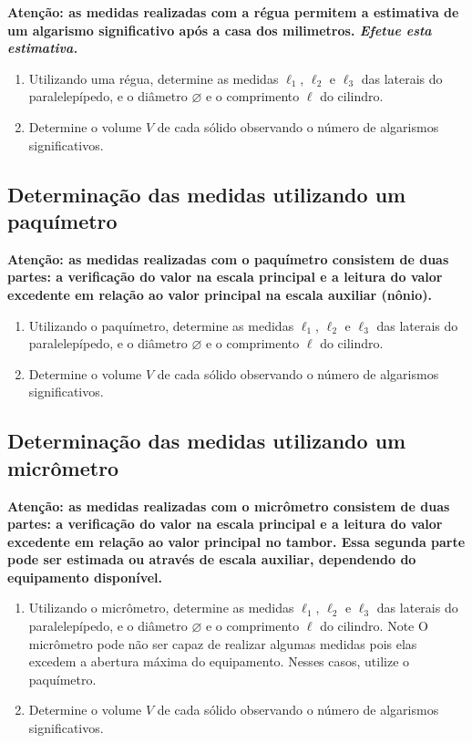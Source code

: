 \textbf{Atenção: as medidas realizadas com a régua permitem a estimativa de um algarismo significativo após a casa dos milimetros. \emph{Efetue esta estimativa.}}

\begin{enumerate}
\item Utilizando uma régua, determine as medidas $\ell_1$, $\ell_2$ e $\ell_3$ das laterais do paralelepípedo, e o diâmetro $\diameter$ e o comprimento $\ell$ do cilindro. 
\item Determine o volume $V$ de cada sólido observando o número de algarismos significativos.
\end{enumerate}

\subsection{Determinação das medidas utilizando um paquímetro}

\textbf{Atenção: as medidas realizadas com o paquímetro consistem de duas partes: a verificação do valor na escala principal e a leitura do valor excedente em relação ao valor principal na escala auxiliar (nônio).}

\begin{enumerate}
\item Utilizando o paquímetro, determine as medidas $\ell_1$, $\ell_2$ e $\ell_3$ das laterais do paralelepípedo, e o diâmetro $\diameter$ e o comprimento $\ell$ do cilindro.
\item Determine o volume $V$ de cada sólido observando o número de algarismos significativos.
\end{enumerate}

\subsection{Determinação das medidas utilizando um micrômetro}

\textbf{Atenção: as medidas realizadas com o micrômetro consistem de duas partes: a verificação do valor na escala principal e a leitura do valor excedente em relação ao valor principal no tambor. Essa segunda parte pode ser estimada ou através de escala auxiliar, dependendo do equipamento disponível.}

\begin{enumerate}
\item Utilizando o micrômetro, determine as medidas $\ell_1$, $\ell_2$ e $\ell_3$ das laterais do paralelepípedo, e o diâmetro $\diameter$ e o comprimento $\ell$ do cilindro. Note O micrômetro pode não ser capaz de realizar algumas medidas pois elas excedem a abertura máxima do equipamento. Nesses casos, utilize o paquímetro.
\item Determine o volume $V$ de cada sólido observando o número de algarismos significativos.
\end{enumerate}

